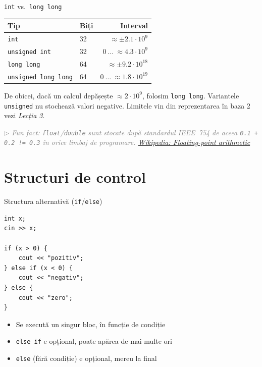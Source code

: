 ﻿\documentclass{beamer}
\begin{document}
\begin{frame}{\texttt{int} vs.\ \texttt{long long}}
  \begin{center}
  \begin{tabular}{llr}
    \toprule
    Tip & Biți & Interval \\
    \midrule
    \texttt{int}                & 32 & $\approx \pm 2.1 \cdot 10^9$ \\
    \texttt{unsigned int}       & 32 & $0\ \ldots\ \approx 4.3 \cdot 10^9$ \\
    \texttt{long long}          & 64 & $\approx \pm 9.2 \cdot 10^{18}$ \\
    \texttt{unsigned long long} & 64 & $0\ \ldots\ \approx 1.8 \cdot 10^{19}$ \\
    \bottomrule
  \end{tabular}
  \end{center}

  \smallskip
  De obicei, dacă un calcul depășește $\approx 2 \cdot 10^9$, folosim \texttt{long long}. Variantele \texttt{unsigned} nu stochează valori negative. Limitele vin din reprezentarea în baza 2 \textemdash{} vezi \emph{Lecția 3}.

  \vfill
  {\footnotesize\textcolor{gray}{\textit{$\triangleright$ Fun fact: \texttt{float}/\texttt{double} sunt stocate după standardul IEEE~754 \textemdash{} de aceea \texttt{0.1 + 0.2 != 0.3} în orice limbaj de programare. \href{https://en.wikipedia.org/wiki/Floating-point_arithmetic\#IEEE_754:_floating_point_in_modern_computers}{Wikipedia: Floating-point arithmetic}}}}
\end{frame}

\section{Structuri de control}

\begin{frame}[fragile]{Structura alternativă (\texttt{if}/\texttt{else})}
  \begin{lstlisting}
int x;
cin >> x;

if (x > 0) {
    cout << "pozitiv";
} else if (x < 0) {
    cout << "negativ";
} else {
    cout << "zero";
}
  \end{lstlisting}
  \begin{itemize}
    \item Se execută un singur bloc, în funcție de condiție
    \item \lstinline|else if| e opțional, poate apărea de mai multe ori
    \item \lstinline|else| (fără condiție) e opțional, mereu la final
  \end{itemize}
\end{frame}
\end{document}

